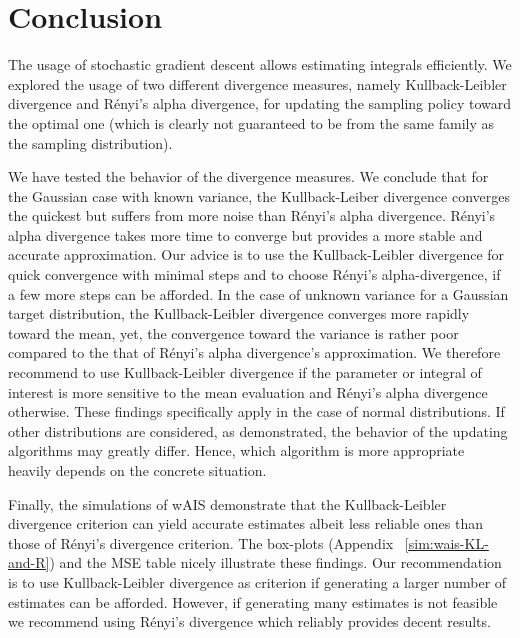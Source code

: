\pagebreak
\section{Conclusion}

The usage of stochastic gradient descent allows estimating integrals efficiently. We explored the usage of two different divergence measures, namely Kullback-Leibler divergence and Rényi's alpha divergence, for  updating the sampling policy toward the optimal one (which is clearly not guaranteed to be from the same family as the sampling distribution). 

\bigskip
We have tested the behavior of the divergence measures.
We conclude that for the Gaussian case with known variance, the Kullback-Leiber divergence converges the quickest but suffers from more noise than Rényi's alpha divergence. Rényi's alpha divergence takes more time to converge but provides a more stable and accurate approximation. Our advice is to use the Kullback-Leibler divergence for quick convergence with minimal steps and to choose Rényi's alpha-divergence, if a few more steps can be afforded.
In the case of unknown variance for a Gaussian target distribution, the Kullback-Leibler divergence converges more rapidly toward the mean, yet, the convergence toward the variance is rather poor compared to the that of Rényi's alpha divergence's approximation. We therefore recommend to use Kullback-Leibler divergence if the parameter or integral of interest is more sensitive to the mean evaluation and Rényi's alpha divergence otherwise. These findings specifically apply in the case of normal distributions. If other distributions are considered, as demonstrated, the behavior of the updating algorithms may greatly differ. Hence, which algorithm is more appropriate heavily depends on the concrete situation.

\bigskip

Finally, the simulations of wAIS demonstrate that the Kullback-Leibler divergence criterion can yield accurate estimates albeit less reliable ones than those of Rényi's divergence criterion. The box-plots (Appendix ~\ref{sim:wais-KL-and-R}) and the MSE table nicely illustrate these findings. Our recommendation is to use Kullback-Leibler divergence as criterion if generating a larger number of estimates can be afforded. However, if generating many estimates is not feasible we recommend using Rényi's divergence which reliably provides decent results.